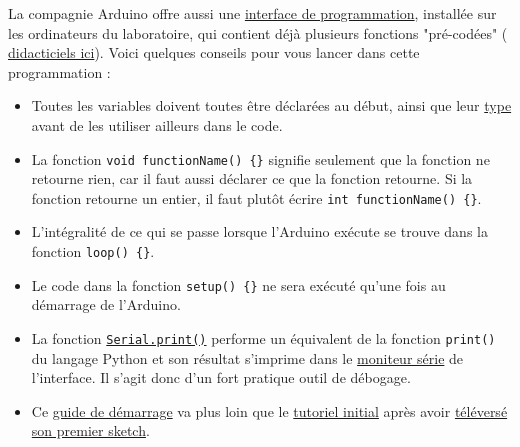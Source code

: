\documentclass[english,french,12pt]{article}
\begin{document}
La compagnie Arduino offre aussi une \href{https://www.arduino.cc/en/software}{interface de programmation}, installée sur les ordinateurs du laboratoire, qui contient déjà plusieurs fonctions "pré-codées" (\href{https://www.arduino.cc/en/Tutorial/BuiltInExamples}{
didacticiels ici}). Voici quelques conseils pour vous lancer dans cette programmation :
\begin{itemize}
    \item Toutes les variables doivent toutes être déclarées au début, ainsi que leur \href{https://en.wikipedia.org/wiki/C_data_types}{type} avant de les utiliser ailleurs dans le code.
    \item La fonction \texttt{void functionName()~\{\}} signifie seulement que la fonction ne retourne rien, car il faut aussi déclarer ce que la fonction retourne. Si la fonction retourne un entier, il faut plutôt écrire \texttt{int functionName()~\{\}}.
    \item L’intégralité de ce qui se passe lorsque l’Arduino exécute se trouve dans la fonction \texttt{loop()~\{\}}.
    \item Le code dans la fonction \texttt{setup()~\{\}} ne sera exécuté qu’une fois au démarrage de l’Arduino.
    \item La fonction \texttt{\href{https://docs.arduino.cc/language-reference/en/functions/communication/serial/print}{Serial.print()}} performe un équivalent de la fonction \texttt{print()} du langage Python et son résultat s'imprime dans le \href{https://docs.arduino.cc/software/ide-v2/tutorials/ide-v2-serial-monitor/#using-the-serial-monitor-tool}{moniteur série} de l'interface. Il s'agit donc d'un fort pratique outil de débogage.
    \item Ce \href{https://docs.arduino.cc/learn/starting-guide/getting-started-arduino/}{guide de démarrage} va plus loin que le \href{https://learn.adafruit.com/groups/ladyadas-learn-arduino}{tutoriel initial} après avoir \href{https://support.arduino.cc/hc/en-us/articles/4733418441116-Upload-a-sketch-in-Arduino-IDE}{téléversé son premier sketch}.
\end{itemize}
\end{document}
